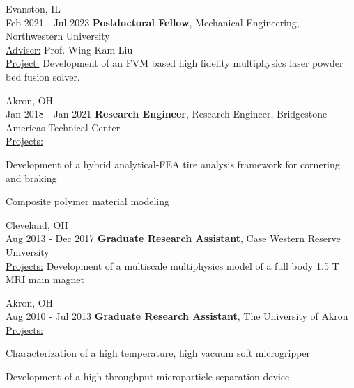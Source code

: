 \documentclass[11pt, letterpaper]{article}
\begin{document}
    \begin{twocolentry}{
        Evanston, IL\\
        Feb 2021 - Jul 2023
    }
        \textbf{Postdoctoral Fellow}, Mechanical Engineering, Northwestern University\\
        \uline{Adviser:} Prof. Wing Kam Liu\\
        \uline{Project:} Development of an FVM based high fidelity multiphysics laser powder bed fusion solver. 
    \end{twocolentry}
    \vspace{5 pt}

    \begin{twocolentry}{
        Akron, OH\\
        Jan 2018 - Jan 2021
    }
        \textbf{Research Engineer}, Research Engineer, Bridgestone Americas Technical Center\\
        \uline{Projects:} 
            \begin{highlightsforbulletentries}
                \item Development of a hybrid analytical-FEA tire analysis framework for
cornering and braking
                \item Composite polymer material modeling
            \end{highlightsforbulletentries}
    \end{twocolentry}
    \vspace{5 pt}

    \begin{twocolentry}{
        Cleveland, OH\\
        Aug 2013 - Dec 2017
    }
        \textbf{Graduate Research Assistant}, Case Western Reserve University\\
        \uline{Projects:} Development of a multiscale multiphysics model of a full body 1.5 T
MRI main magnet
    \end{twocolentry}
    \vspace{5 pt}

    \begin{twocolentry}{
        Akron, OH\\
        Aug 2010 - Jul 2013
    }
        \textbf{Graduate Research Assistant}, The University of Akron\\
        \uline{Projects:} 
            \begin{highlightsforbulletentries}
                \item Characterization of a high temperature, high vacuum soft microgripper
                \item Development of a high throughput microparticle separation device
            \end{highlightsforbulletentries}
    \end{twocolentry}
    \vspace{5 pt}
\end{document}

